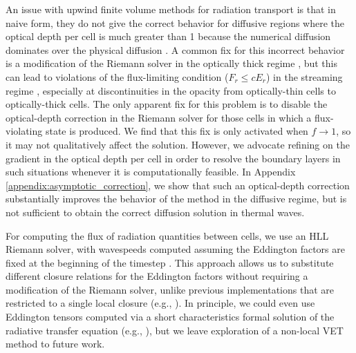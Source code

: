 \documentclass[fleqn,usenatbib]{mnras}
\begin{document}
An issue with upwind finite volume methods for radiation transport is that in naive form, they do not give the correct behavior for diffusive regions where the optical depth per cell is much greater than 1 because the numerical diffusion dominates over the physical diffusion \citep{Lowrie_2001}. A common fix for this incorrect behavior is a modification of the Riemann solver in the optically thick regime \citep{Audit_2002,Skinner_2019,Mezzacappa_2020}, but this can lead to violations of the flux-limiting condition ($F_r \leq cE_r$) in the streaming regime \citep{Audit_2002}, especially at discontinuities in the opacity from optically-thin cells to optically-thick cells. The only apparent fix for this problem is to disable the optical-depth correction in the Riemann solver for those cells in which a flux-violating state is produced. We find that this fix is only activated when $f \rightarrow 1$, so it may not qualitatively affect the solution. However, we advocate refining on the gradient in the optical depth per cell in order to resolve the boundary layers in such situations whenever it is computationally feasible. In Appendix \ref{appendix:asymptotic_correction}, we show that such an optical-depth correction substantially improves the behavior of the method in the diffusive regime, but is not sufficient to obtain the correct diffusion solution in thermal waves.

For computing the flux of radiation quantities between cells, we use an HLL Riemann solver, with wavespeeds computed assuming the Eddington factors are fixed at the beginning of the timestep \citep{Balsara_1999}. This approach allows us to substitute different closure relations for the Eddington factors without requiring a modification of the Riemann solver, unlike previous implementations that are restricted to a single local closure (e.g., \citealt{Gonzalez_2007,Skinner_2013,Skinner_2019}). In principle, we could even use Eddington tensors computed via a short characteristics formal solution of the radiative transfer equation (e.g., \citealt{Davis_2012}), but we leave exploration of a non-local VET method to future work.
\end{document}
